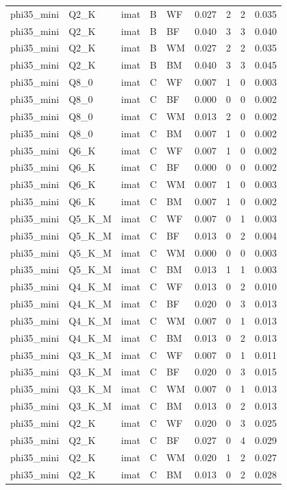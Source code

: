 \begin{tabular}{lllllrrrr}
phi35\_mini & Q2\_K & imat & B & WF & 0.027 & 2 & 2 & 0.035 \\
phi35\_mini & Q2\_K & imat & B & BF & 0.040 & 3 & 3 & 0.040 \\
phi35\_mini & Q2\_K & imat & B & WM & 0.027 & 2 & 2 & 0.035 \\
phi35\_mini & Q2\_K & imat & B & BM & 0.040 & 3 & 3 & 0.045 \\
phi35\_mini & Q8\_0 & imat & C & WF & 0.007 & 1 & 0 & 0.003 \\
phi35\_mini & Q8\_0 & imat & C & BF & 0.000 & 0 & 0 & 0.002 \\
phi35\_mini & Q8\_0 & imat & C & WM & 0.013 & 2 & 0 & 0.002 \\
phi35\_mini & Q8\_0 & imat & C & BM & 0.007 & 1 & 0 & 0.002 \\
phi35\_mini & Q6\_K & imat & C & WF & 0.007 & 1 & 0 & 0.002 \\
phi35\_mini & Q6\_K & imat & C & BF & 0.000 & 0 & 0 & 0.002 \\
phi35\_mini & Q6\_K & imat & C & WM & 0.007 & 1 & 0 & 0.003 \\
phi35\_mini & Q6\_K & imat & C & BM & 0.007 & 1 & 0 & 0.002 \\
phi35\_mini & Q5\_K\_M & imat & C & WF & 0.007 & 0 & 1 & 0.003 \\
phi35\_mini & Q5\_K\_M & imat & C & BF & 0.013 & 0 & 2 & 0.004 \\
phi35\_mini & Q5\_K\_M & imat & C & WM & 0.000 & 0 & 0 & 0.003 \\
phi35\_mini & Q5\_K\_M & imat & C & BM & 0.013 & 1 & 1 & 0.003 \\
phi35\_mini & Q4\_K\_M & imat & C & WF & 0.013 & 0 & 2 & 0.010 \\
phi35\_mini & Q4\_K\_M & imat & C & BF & 0.020 & 0 & 3 & 0.013 \\
phi35\_mini & Q4\_K\_M & imat & C & WM & 0.007 & 0 & 1 & 0.013 \\
phi35\_mini & Q4\_K\_M & imat & C & BM & 0.013 & 0 & 2 & 0.013 \\
phi35\_mini & Q3\_K\_M & imat & C & WF & 0.007 & 0 & 1 & 0.011 \\
phi35\_mini & Q3\_K\_M & imat & C & BF & 0.020 & 0 & 3 & 0.015 \\
phi35\_mini & Q3\_K\_M & imat & C & WM & 0.007 & 0 & 1 & 0.013 \\
phi35\_mini & Q3\_K\_M & imat & C & BM & 0.013 & 0 & 2 & 0.013 \\
phi35\_mini & Q2\_K & imat & C & WF & 0.020 & 0 & 3 & 0.025 \\
phi35\_mini & Q2\_K & imat & C & BF & 0.027 & 0 & 4 & 0.029 \\
phi35\_mini & Q2\_K & imat & C & WM & 0.020 & 1 & 2 & 0.027 \\
phi35\_mini & Q2\_K & imat & C & BM & 0.013 & 0 & 2 & 0.028 \\
\bottomrule
\end{tabular}

